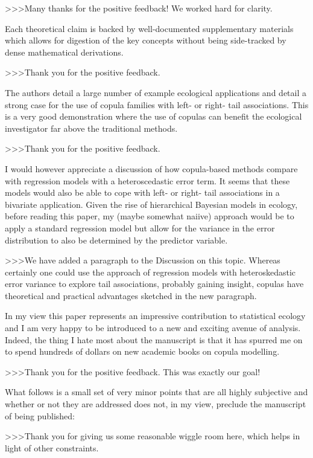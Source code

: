 >>>Many thanks for the positive feedback! We worked hard for clarity.

Each theoretical claim is backed by well-documented supplementary materials which allows for 
digestion of the key concepts without being side-tracked by dense mathematical derivations.

>>>Thank you for the positive feedback.

The authors detail a large number of example ecological applications and detail a strong case 
for the use of copula families with left- or right- tail associations.  This is a very good 
demonstration where the use of copulas can benefit the ecological investigator far above the 
traditional methods.  

>>>Thank you for the positive feedback.

I would however appreciate a discussion of how copula-based methods compare with regression 
models with a heteroscedastic error term.  It seems that these models would also be able to 
cope with left- or right- tail associations in a bivariate application.  Given the rise of 
hierarchical Bayesian models in ecology, before reading this paper, my (maybe somewhat naiive) 
approach would be to apply a standard regression model but allow for the variance in the error 
distribution to also be determined by the predictor variable.

>>>We have added a paragraph to the Discussion on this topic. Whereas certainly 
one could use the approach of regression models with heteroskedastic error variance to 
explore tail associations, probably gaining insight, copulas have theoretical 
and practical advantages sketched in the new paragraph.

In my view this paper represents an impressive contribution to statistical ecology and I am 
very happy to be introduced to a new and exciting avenue of analysis.  Indeed, the thing I 
hate most about the manuscript is that it has spurred me on to spend hundreds of dollars on 
new academic books on copula modelling.

>>>Thank you for the positive feedback. This was exactly our goal!

What follows is a small set of very minor points that are all highly subjective and whether 
or not they are addressed does not, in my view, preclude the manuscript of being published:

>>>Thank you for giving us some reasonable wiggle room here, which helps in light of 
other constraints.

